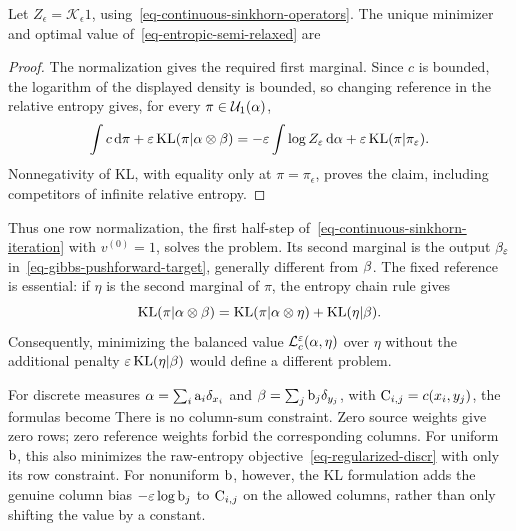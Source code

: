 \begin{prop}\label{prop-entropic-semi-relaxed}
Let $Z_\epsilon=\mathcal K_\epsilon 1$, using~\eqref{eq-continuous-sinkhorn-operators}. The unique minimizer and optimal value of~\eqref{eq-entropic-semi-relaxed} are
\end{prop}
\begin{proof}
The normalization gives the required first marginal. Since $c$ is bounded, the logarithm of the displayed density is bounded, so changing reference in the relative entropy gives, for every $\pi\in\mathcal{U}_1(\alpha)$,
\[
    \int c\,\mathrm{d}\pi+\varepsilon\operatorname{KL}(\pi|\alpha\otimes\beta)
    =-\varepsilon\int\log Z_\varepsilon\,\mathrm{d}\alpha
      +\varepsilon\operatorname{KL}(\pi|\pi_\varepsilon).
\]
Nonnegativity of KL, with equality only at $\pi=\pi_\epsilon$, proves the claim, including competitors of infinite relative entropy.
\end{proof}
Thus one row normalization, the first half-step of~\eqref{eq-continuous-sinkhorn-iteration} with $v^{(0)}=1$, solves the problem. Its second marginal is the output $\beta_\varepsilon$ in~\eqref{eq-gibbs-pushforward-target}, generally different from $\beta$. The fixed reference is essential: if $\eta$ is the second marginal of $\pi$, the entropy chain rule gives
\[
    \operatorname{KL}(\pi|\alpha\otimes\beta)
    =\operatorname{KL}(\pi|\alpha\otimes\eta)+\operatorname{KL}(\eta|\beta).
\]
Consequently, minimizing the balanced value $\mathcal{L}_c^\varepsilon(\alpha,\eta)$ over $\eta$ without the additional penalty $\varepsilon\operatorname{KL}(\eta|\beta)$ would define a different problem.

For discrete measures $\alpha=\sum_i\mathrm{a}_i\delta_{x_i}$ and $\beta=\sum_j\mathrm{b}_j\delta_{y_j}$, with $\mathrm{C}_{i,j}=c(x_i,y_j)$, the formulas become
There is no column-sum constraint. Zero source weights give zero rows; zero reference weights forbid the corresponding columns. For uniform $\mathrm{b}$, this also minimizes the raw-entropy objective~\eqref{eq-regularized-discr} with only its row constraint. For nonuniform $\mathrm{b}$, however, the KL formulation adds the genuine column bias $-\varepsilon\log\mathrm{b}_j$ to $\mathrm{C}_{i,j}$ on the allowed columns, rather than only shifting the value by a constant.

